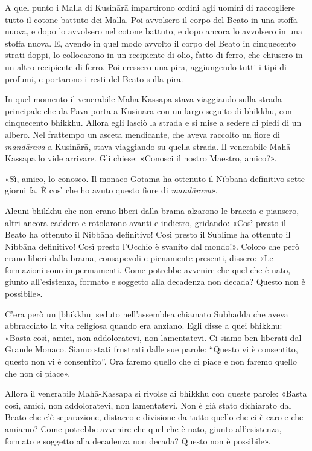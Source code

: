 A quel punto i Malla di Kusinārā impartirono ordini agli uomini di
raccogliere tutto il cotone battuto dei Malla. Poi avvolsero il corpo
del Beato in una stoffa nuova, e dopo lo avvolsero nel cotone battuto, e
dopo ancora lo avvolsero in una stoffa nuova. E, avendo in quel modo
avvolto il corpo del Beato in cinquecento strati doppi, lo collocarono
in un recipiente di olio, fatto di ferro, che chiusero in un altro
recipiente di ferro. Poi eressero una pira, aggiungendo tutti i tipi di
profumi, e portarono i resti del Beato sulla pira.




In quel momento il venerabile Mahā-Kassapa stava viaggiando sulla strada
principale che da Pāvā porta a Kusinārā con un largo seguito di bhikkhu,
con cinquecento bhikkhu. Allora egli lasciò la strada e si mise a sedere
ai piedi di un albero. Nel frattempo un asceta mendicante, che aveva
raccolto un fiore di \emph{mandārava} a Kusinārā, stava viaggiando su quella
strada. Il venerabile Mahā-Kassapa lo vide arrivare. Gli chiese:
«Conosci il nostro Maestro, amico?».


«Sì, amico, lo conosco. Il monaco Gotama ha ottenuto il Nibbāna
definitivo sette giorni fa. È così che ho avuto questo fiore di
\emph{mandārava}».


Alcuni bhikkhu che non erano liberi dalla brama alzarono le braccia e
piansero, altri ancora caddero e rotolarono avanti e indietro, gridando:
«Così presto il Beato ha ottenuto il Nibbāna definitivo! Così presto il
Sublime ha ottenuto il Nibbāna definitivo! Così presto l’Occhio è
svanito dal mondo!». Coloro che però erano liberi dalla brama,
consapevoli e pienamente presenti, dissero: «Le formazioni sono
impermamenti. Come potrebbe avvenire che quel che è nato, giunto
all’esistenza, formato e soggetto alla decadenza non decada? Questo non
è possibile».


C’era però un [bhikkhu] seduto nell’assemblea chiamato Subhadda che
aveva abbracciato la vita religiosa quando era anziano. Egli disse a
quei bhikkhu: «Basta così, amici, non addoloratevi, non lamentatevi. Ci
siamo ben liberati dal Grande Monaco. Siamo stati frustrati dalle sue
parole: “Questo vi è consentito, questo non vi è consentito”. Ora faremo
quello che ci piace e non faremo quello che non ci piace».


Allora il venerabile Mahā-Kassapa si rivolse ai bhikkhu con queste
parole: «Basta così, amici, non addoloratevi, non lamentatevi. Non è già
stato dichiarato dal Beato che c’è separazione, distacco e divisione da
tutto quello che ci è caro e che amiamo? Come potrebbe avvenire che quel
che è nato, giunto all’esistenza, formato e soggetto alla decadenza non
decada? Questo non è possibile».



